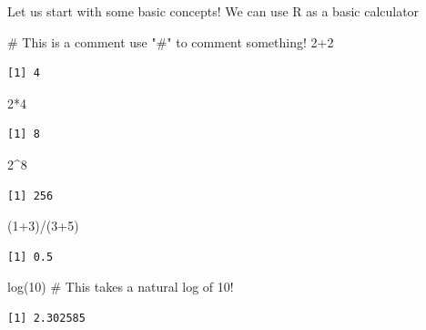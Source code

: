 \documentclass[
  letterpaper,
]{book}
\newenvironment{Shaded}{\begin{snugshade}}{\end{snugshade}}
\newcommand{\CommentTok}[1]{\textcolor[rgb]{0.37,0.37,0.37}{#1}}
\newcommand{\DecValTok}[1]{\textcolor[rgb]{0.68,0.00,0.00}{#1}}
\newcommand{\FunctionTok}[1]{\textcolor[rgb]{0.28,0.35,0.67}{#1}}
\newcommand{\NormalTok}[1]{\textcolor[rgb]{0.00,0.23,0.31}{#1}}
\newcommand{\SpecialCharTok}[1]{\textcolor[rgb]{0.37,0.37,0.37}{#1}}
\begin{document}
Let us start with some basic concepts! We can use R as a basic
calculator

\begin{Shaded}
\begin{Highlighting}[]
\CommentTok{\# This is a comment use "\#" to comment something!}
\DecValTok{2}\SpecialCharTok{+}\DecValTok{2}
\end{Highlighting}
\end{Shaded}

\begin{verbatim}
[1] 4
\end{verbatim}

\begin{Shaded}
\begin{Highlighting}[]
\DecValTok{2}\SpecialCharTok{*}\DecValTok{4} 
\end{Highlighting}
\end{Shaded}

\begin{verbatim}
[1] 8
\end{verbatim}

\begin{Shaded}
\begin{Highlighting}[]
\DecValTok{2}\SpecialCharTok{\^{}}\DecValTok{8}
\end{Highlighting}
\end{Shaded}

\begin{verbatim}
[1] 256
\end{verbatim}

\begin{Shaded}
\begin{Highlighting}[]
\NormalTok{(}\DecValTok{1}\SpecialCharTok{+}\DecValTok{3}\NormalTok{)}\SpecialCharTok{/}\NormalTok{(}\DecValTok{3}\SpecialCharTok{+}\DecValTok{5}\NormalTok{)}
\end{Highlighting}
\end{Shaded}

\begin{verbatim}
[1] 0.5
\end{verbatim}

\begin{Shaded}
\begin{Highlighting}[]
\FunctionTok{log}\NormalTok{(}\DecValTok{10}\NormalTok{) }\CommentTok{\# This takes a natural log of 10! }
\end{Highlighting}
\end{Shaded}

\begin{verbatim}
[1] 2.302585
\end{verbatim}
\end{document}
